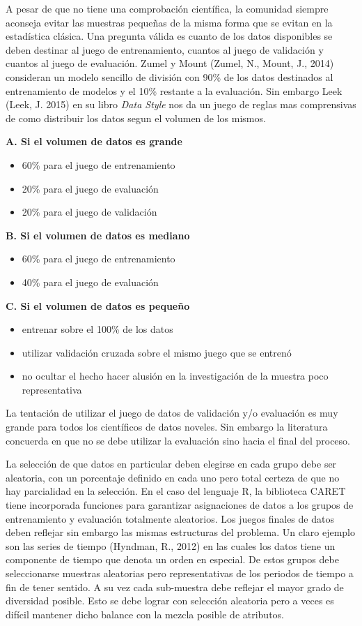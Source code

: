 A pesar de que no tiene una comprobación científica, la comunidad siempre aconseja evitar las muestras pequeñas de la misma forma que se evitan en la estadística clásica. Una pregunta válida es cuanto de los datos disponibles se deben destinar al juego de entrenamiento, cuantos al juego de validación y cuantos al juego de evaluación. Zumel y Mount (Zumel, N., Mount, J., 2014) consideran un modelo sencillo de división con 90\% de los datos destinados al entrenamiento de modelos y el 10\% restante a la evaluación. Sin embargo Leek (Leek, J. 2015) en su libro \emph{Data Style} nos da un juego de reglas mas comprensivas de como distribuir los datos segun el volumen de los mismos. 

\textbf{A. Si el volumen de datos es grande}
\begin{itemize}
	\item 60\% para el juego de entrenamiento
	\item 20\% para el juego de evaluación
	\item 20\% para el juego de validación 
\end{itemize}

\textbf{B. Si el volumen de datos es mediano}
\begin{itemize}
	\item 60\% para el juego de entrenamiento
	\item 40\% para el juego de evaluación
\end{itemize}

\textbf{C. Si el volumen de datos es pequeño}
\begin{itemize}
	\item entrenar sobre el 100\% de los datos
	\item utilizar validación cruzada sobre el mismo juego que se entrenó
	\item no ocultar el hecho hacer alusión en la investigación de la muestra poco representativa
\end{itemize}

La tentación de utilizar el juego de datos de validación y/o evaluación es muy grande para todos los científicos de datos noveles. Sin embargo la literatura concuerda en que no se debe utilizar la evaluación sino hacia el final del proceso. 

La selección de que datos en particular deben elegirse en cada grupo debe ser aleatoria, con un porcentaje definido en cada uno pero total certeza de que no hay parcialidad en la selección. En el caso del lenguaje R, la biblioteca CARET tiene incorporada funciones para garantizar asignaciones de datos a los grupos de entrenamiento y evaluación totalmente aleatorios. Los juegos finales de datos deben reflejar sin embargo las mismas estructuras del problema. Un claro ejemplo son las series de tiempo (Hyndman, R., 2012) en las cuales los datos tiene un componente de tiempo que denota un orden en especial. De estos grupos debe seleccionarse muestras aleatorias pero representativas de los periodos de tiempo a fin de tener sentido. A su vez cada sub-muestra debe reflejar el mayor grado de diversidad posible. Esto se debe lograr con selección aleatoria pero a veces es difícil mantener dicho balance con la mezcla posible de atributos.

